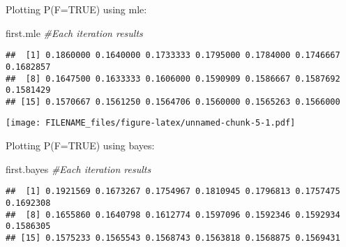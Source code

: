 \documentclass[
]{article}
\newenvironment{Shaded}{\begin{snugshade}}{\end{snugshade}}
\newcommand{\AttributeTok}[1]{\textcolor[rgb]{0.77,0.63,0.00}{#1}}
\newcommand{\CommentTok}[1]{\textcolor[rgb]{0.56,0.35,0.01}{\textit{#1}}}
\newcommand{\DecValTok}[1]{\textcolor[rgb]{0.00,0.00,0.81}{#1}}
\newcommand{\FloatTok}[1]{\textcolor[rgb]{0.00,0.00,0.81}{#1}}
\newcommand{\FunctionTok}[1]{\textcolor[rgb]{0.00,0.00,0.00}{#1}}
\newcommand{\NormalTok}[1]{#1}
\newcommand{\OtherTok}[1]{\textcolor[rgb]{0.56,0.35,0.01}{#1}}
\newcommand{\SpecialCharTok}[1]{\textcolor[rgb]{0.00,0.00,0.00}{#1}}
\newcommand{\StringTok}[1]{\textcolor[rgb]{0.31,0.60,0.02}{#1}}
\begin{document}
Plotting P(F=TRUE) using mle:

\begin{Shaded}
\begin{Highlighting}[]
\NormalTok{first.mle }\CommentTok{\#Each iteration results}
\end{Highlighting}
\end{Shaded}

\begin{verbatim}
##  [1] 0.1860000 0.1640000 0.1733333 0.1795000 0.1784000 0.1746667 0.1682857
##  [8] 0.1647500 0.1633333 0.1606000 0.1590909 0.1586667 0.1587692 0.1581429
## [15] 0.1570667 0.1561250 0.1564706 0.1560000 0.1565263 0.1566000
\end{verbatim}

\begin{Shaded}
\end{Shaded}

\texttt{[image: FILENAME\_files/figure-latex/unnamed-chunk-5-1.pdf]}

Plotting P(F=TRUE) using bayes:

\begin{Shaded}
\begin{Highlighting}[]
\NormalTok{first.bayes }\CommentTok{\#Each iteration results}
\end{Highlighting}
\end{Shaded}

\begin{verbatim}
##  [1] 0.1921569 0.1673267 0.1754967 0.1810945 0.1796813 0.1757475 0.1692308
##  [8] 0.1655860 0.1640798 0.1612774 0.1597096 0.1592346 0.1592934 0.1586305
## [15] 0.1575233 0.1565543 0.1568743 0.1563818 0.1568875 0.1569431
\end{verbatim}
\end{document}
